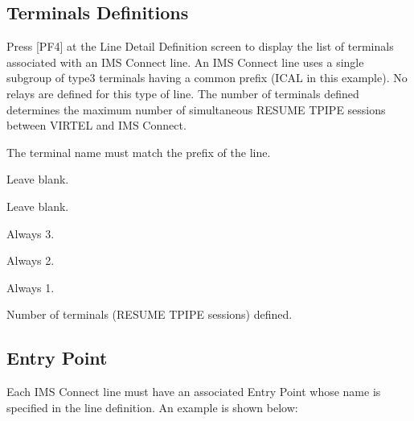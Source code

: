 \documentclass[letterpaper,10pt,english]{sphinxmanual}
\begin{document}
\ignorespaces 

\subsection{Terminals Definitions}
\label{\detokenize{connectivity_guide:terminals-definitions}}\label{\detokenize{connectivity_guide:index-23}}
\sphinxAtStartPar
Press {[}PF4{]} at the Line Detail Definition screen to display the list of terminals associated with an IMS Connect line. An IMS Connect line uses a single sub\sphinxhyphen{}group of type\sphinxhyphen{}3 terminals having a common prefix (ICAL in this example). No relays are defined for this type of line. The number of terminals defined determines the maximum number of simultaneous RESUME TPIPE sessions between VIRTEL and IMS Connect.

\sphinxAtStartPar
{}
\begin{description}
\sphinxAtStartPar
The terminal name must match the prefix of the line.

\sphinxAtStartPar
Leave blank.

\sphinxAtStartPar
Leave blank.

\sphinxAtStartPar
Always 3.

\sphinxAtStartPar
Always 2.

\sphinxAtStartPar
Always 1.

\sphinxAtStartPar
Number of terminals (RESUME TPIPE sessions) defined.

\end{description}

\ignorespaces 

\subsection{Entry Point}
\label{\detokenize{connectivity_guide:entry-point}}\label{\detokenize{connectivity_guide:index-24}}
\sphinxAtStartPar
Each IMS Connect line must have an associated Entry Point whose name is specified in the line definition. An example is shown below:
\end{document}
